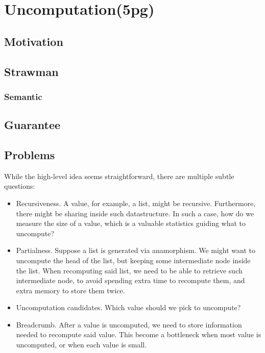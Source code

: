 \documentclass[acmsmall]{acmart}
\begin{document}
		
	
	
	\maketitle
	
	\section{Uncomputation(5pg)}
	\subsection{Motivation}
	\subsection{Strawman}
	\subsubsection{Semantic}
	\subsection{Guarantee}
	\subsection{Problems}
	While the high-level idea seems straightforward, there are multiple subtle questions: 
	\begin{itemize}
		\item Recursiveness. A value, for example, a list, might be recursive. Furthermore, there might be sharing inside such datastructure. In such a case, how do we measure the size of a value, which is a valuable statistics guiding what to uncompute?
		\item Partialness. Suppose a list is generated via anamorphism. We might want to uncompute the head of the list, but keeping some intermediate node inside the list.
		When recomputing said list, we need to be able to retrieve such intermediate node, to
		avoid spending extra time to recompute them, and extra memory to store them twice.
		\item Uncomputation candidates. Which value should we pick to uncompute?
		\item Breadcrumb. After a value is uncomputed, we need to store information needed to recompute said value. This become a bottleneck when most value is uncomputed, or when each value is small.
	\end{itemize}
	
\end{document}
